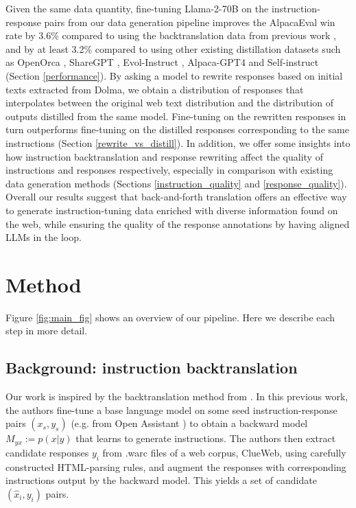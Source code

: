 Given the same data quantity, fine-tuning Llama-2-70B on the instruction-response pairs from our data generation pipeline improves the AlpacaEval win rate by 3.6\% compared to using the backtranslation data from previous work \cite{li2023self}, and by at least 3.2\% compared to using other existing distillation datasets such as OpenOrca \cite{OpenOrca}, ShareGPT \cite{vicuna2023}, Evol-Instruct \cite{xu2023wizardlm}, Alpaca-GPT4 \cite{peng2023instruction} and Self-instruct \cite{wang2022self} (Section \ref{performance}). By asking a model to rewrite responses based on initial texts extracted from Dolma, we obtain a distribution of responses that interpolates between the original web text distribution and the distribution of outputs distilled from the same model. Fine-tuning on the rewritten responses in turn outperforms fine-tuning on the distilled responses corresponding to the same instructions (Section \ref{rewrite_vs_distill}). In addition, we offer some insights into how instruction backtranslation and response rewriting affect the quality of instructions and responses respectively, especially in comparison with existing data generation methods (Sections \ref{instruction_quality} and \ref{response_quality}). Overall our results suggest that back-and-forth translation offers an effective way to generate instruction-tuning data enriched with diverse information found on the web, while ensuring the quality of the response annotations by having aligned LLMs in the loop.
\vspace{-0.25em}
\section{Method}\label{method}
Figure \ref{fig:main_fig} shows an overview of our pipeline. Here we describe each step in more detail.
\vspace{-0.25em}
\subsection{Background: instruction backtranslation}
Our work is inspired by the backtranslation method from \citet{li2023self}. In this previous work, the authors fine-tune a base language model on some seed instruction-response pairs ${(x_s, y_s)}$ (e.g. from Open Assistant \cite{kopf2024openassistant}) to obtain a backward model $M_{yx} := p(x|y)$ that learns to generate instructions. The authors then extract candidate responses ${y_i}$ from .warc files of a web corpus, ClueWeb, using carefully constructed HTML-parsing rules, and augment the responses with corresponding instructions output by the backward model. This yields a set of candidate ${(\hat{x}_i, y_i)}$ pairs. 


